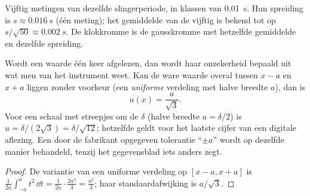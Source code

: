 \begin{omfigure}

{\small Vijftig metingen van dezelfde slingerperiode, in klassen van
\qty{0.01}{s}. Hun spreiding is $s \approx \qty{0.016}{s}$ (één meting);
het gemiddelde van de vijftig is bekend tot op $s/\sqrt{50} \approx \qty{0.002}{s}$.
De klokkromme is de gausskromme met hetzelfde gemiddelde en dezelfde spreiding.}
\end{omfigure}

\begin{proposition}\label{prop:b1:units-dimensions:typeB}
Wordt een waarde één keer afgelezen, dan wordt haar onzekerheid bepaald uit
wat men van het instrument weet. Kan de ware waarde overal tussen
$x - a$ en $x + a$ liggen zonder voorkeur (een \emph{uniforme} verdeling met
halve breedte $a$), dan is
\[
u(x) = \frac{a}{\sqrt 3} .
\]
Voor een schaal met streepjes om de $\delta$ (halve breedte $a = \delta/2$) is
$u = \delta/(2\sqrt3) = \delta/\sqrt{12}$; hetzelfde geldt voor het laatste
cijfer van een digitale aflezing. Een door de fabrikant opgegeven tolerantie
``$\pm a$'' wordt op dezelfde manier behandeld, tenzij het gegevensblad iets
anders zegt.
\end{proposition}

\begin{proof}
De variantie van een uniforme verdeling op $[x - a, x + a]$ is
$\frac{1}{2a}\int_{-a}^{a} t^2\,\dd t = \frac{1}{2a}\cdot\frac{2a^3}{3}
= \frac{a^2}{3}$; haar standaardafwijking is $a/\sqrt3$.
\end{proof}

